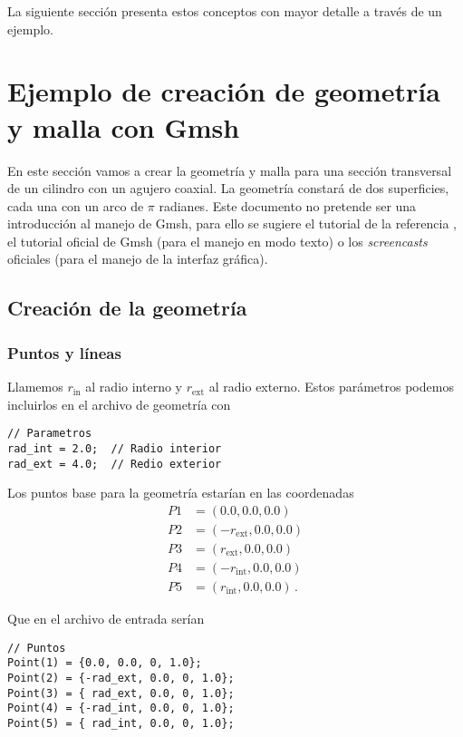 La siguiente sección presenta estos conceptos con mayor detalle a través de un ejemplo.


\section{Ejemplo de creación de geometría y malla con Gmsh}
En este sección vamos a crear la geometría y malla para una sección transversal de un cilindro con un agujero coaxial. La geometría constará de dos superficies, cada una con un arco de \(\pi\) radianes. Este documento no pretende ser una introducción al manejo de Gmsh, para ello se sugiere el tutorial de la referencia \cite{avdis2012}, el tutorial oficial de Gmsh \cite{gmsh-tutorial} (para el manejo en modo texto) o los \emph{screencasts} oficiales \cite{gmsh-screencast} (para el manejo de la interfaz gráfica).

\subsection{Creación de la geometría}

\subsubsection{Puntos y líneas}
Llamemos \(r_\text{in}\) al radio interno y \(r_\text{ext}\) al radio externo. Estos parámetros podemos
incluirlos en el archivo de geometría con

\begin{verbatim}
// Parametros
rad_int = 2.0;  // Radio interior
rad_ext = 4.0;  // Redio exterior
\end{verbatim}


Los puntos base para la geometría estarían en las coordenadas
\begin{align*}
P1 &= (0.0, 0.0, 0.0)\\
P2 &= (-r_\text{ext}, 0.0, 0.0)\\
P3 &= ( r_\text{ext}, 0.0, 0.0)\\
P4 &= (-r_\text{int}, 0.0, 0.0)\\
P5 &= (r_\text{int}, 0.0, 0.0)\, .
\end{align*}

Que en el archivo de entrada serían

\begin{verbatim}
// Puntos
Point(1) = {0.0, 0.0, 0, 1.0};
Point(2) = {-rad_ext, 0.0, 0, 1.0};
Point(3) = { rad_ext, 0.0, 0, 1.0};
Point(4) = {-rad_int, 0.0, 0, 1.0};
Point(5) = { rad_int, 0.0, 0, 1.0};
\end{verbatim}


